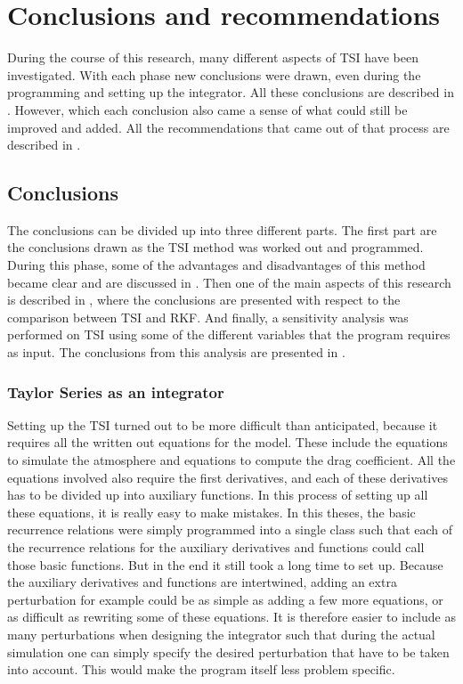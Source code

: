 \chapter{Conclusions and recommendations} 
\label{ch:conclusionsandrecommendations}
During the course of this research, many different aspects of \ac{TSI} have been investigated. With each phase new conclusions were drawn, even during the programming and setting up the integrator. All these conclusions are described in . However, which each conclusion also came a sense of what could still be improved and added. All the recommendations that came out of that process are described in .


\section{Conclusions}
\label{sec:conclusions}
The conclusions can be divided up into three different parts. The first part are the conclusions drawn as the \ac{TSI} method was worked out and programmed. During this phase, some of the advantages and disadvantages of this method became clear and are discussed in . Then one of the main aspects of this research is described in , where the conclusions are presented with respect to the comparison between \ac{TSI} and \ac{RKF}. And finally, a sensitivity analysis was performed on \ac{TSI} using some of the different variables that the program requires as input. The conclusions from this analysis are presented in .

\subsection{Taylor Series as an integrator}
\label{subsec:taylorSeriesAsAnIntegrator}
Setting up the \ac{TSI} turned out to be more difficult than anticipated, because it requires all the written out equations for the model. These include the equations to simulate the atmosphere and equations to compute the drag coefficient. All the equations involved also require the first derivatives, and each of these derivatives has to be divided up into auxiliary functions. In this process of setting up all these equations, it is really easy to make mistakes. In this theses, the basic recurrence relations were simply programmed into a single class such that each of the recurrence relations for the auxiliary derivatives and functions could call those basic functions. But in the end it still took a long time to set up. Because the auxiliary derivatives and functions are intertwined, adding an extra perturbation for example could be as simple as adding a few more equations, or as difficult as rewriting some of these equations. It is therefore easier to include as many perturbations when designing the integrator such that during the actual simulation one can simply specify the desired perturbation that have to be taken into account. This would make the program itself less problem specific. \\

